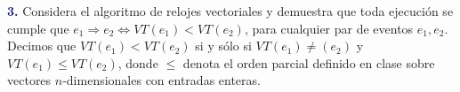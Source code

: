 \newpage
\textbf{\textcolor{MidnightBlue}{3.}}
Considera el algoritmo de relojes vectoriales y demuestra que toda ejecución se cumple
que $e_1\Rightarrow e_2 \Leftrightarrow VT(e_1)<VT(e_2)$, para cualquier par de eventos
$e_1,e_2$. Decimos que $VT(e_1)<VT(e_2)$ si y sólo si $VT(e_1) \neq (e_2)$ y
$VT(e_1)\leq VT(e_2)$, donde $\leq$ denota el orden parcial definido en clase sobre
vectores $n$-dimensionales con entradas enteras.
